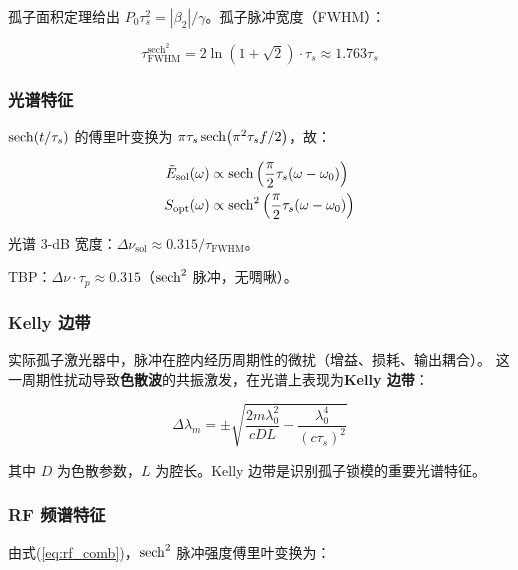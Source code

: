 \documentclass[11pt,a4paper]{article}
\newcommand{\gvd}{\beta_2}
\newcommand{\spm}{\gamma}
\begin{document}
孤子面积定理给出 $P_0 \tau_s^2 = |\gvd|/\spm$。孤子脉冲宽度（FWHM）：

\begin{equation}\label{eq:soliton_fwhm}
\tau_{\text{FWHM}}^{\text{sech}^2} = 2\ln(1+\sqrt{2}) \cdot \tau_s \approx 1.763 \tau_s
\end{equation}

\subsubsection{光谱特征}

$\sech(t/\tau_s)$ 的傅里叶变换为 $\pi \tau_s \sech(\pi^2 \tau_s f/2)$，故：

\begin{equation}\label{eq:soliton_spectrum}
\begin{aligned}
\tilde{E}_{\text{sol}}(\omega) &\propto \sech\left(\frac{\pi}{2} \tau_s (\omega - \omega_0)\right) \\
S_{\text{opt}}(\omega) &\propto \sech^2\left(\frac{\pi}{2} \tau_s (\omega - \omega_0)\right)
\end{aligned}
\end{equation}

光谱 3-dB 宽度：$\Delta \nu_{\text{sol}} \approx 0.315 / \tau_{\text{FWHM}}$。

TBP：$\Delta \nu \cdot \tau_p \approx 0.315$（$\sech^2$ 脉冲，无啁啾）。

\subsubsection{Kelly 边带}

实际孤子激光器中，脉冲在腔内经历周期性的微扰（增益、损耗、输出耦合）。
这一周期性扰动导致\textbf{色散波}的共振激发，在光谱上表现为\textbf{Kelly 边带}\cite{Kelly1992}：

\begin{equation}\label{eq:kelly}
\Delta \lambda_m = \pm \sqrt{\frac{2m\lambda_0^2}{c D L} - \frac{\lambda_0^4}{(c \tau_s)^2}}
\end{equation}

其中 $D$ 为色散参数，$L$ 为腔长。Kelly 边带是识别孤子锁模的重要光谱特征。

\subsubsection{RF 频谱特征}

由式(\ref{eq:rf_comb})，$\sech^2$ 脉冲强度傅里叶变换为：
\end{document}
